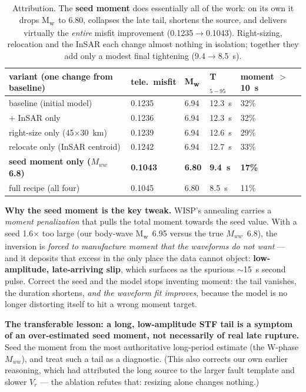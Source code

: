 \documentclass[11pt]{article}
\newcommand{\Mw}{M\textsubscript{w}}
\begin{document}
\begin{table}[H]\centering\small
\begin{tabular}{lllll}
\toprule
variant (one change from baseline) & tele.\ misfit & \Mw & T$_{5-95}$ & moment $>$10~s \\
\midrule
baseline (initial model) & 0.1235 & 6.94 & 12.3~s & 32\% \\
$+$ InSAR only & 0.1236 & 6.94 & 12.3~s & 32\% \\
right-size only (45$\times$30~km) & 0.1239 & 6.94 & 12.6~s & 29\% \\
relocate only (InSAR centroid) & 0.1242 & 6.94 & 12.7~s & 33\% \\
\textbf{seed moment only ($M_{ww}$ 6.8)} & \textbf{0.1043} & \textbf{6.80} & \textbf{9.4~s} & \textbf{17\%} \\
full recipe (all four) & 0.1045 & 6.80 & 8.5~s & 11\% \\
\bottomrule
\end{tabular}
\caption{Attribution. The \textbf{seed moment} does essentially all of the work: on its own it drops
\Mw\ to 6.80, collapses the late tail, shortens the source, and delivers virtually the \emph{entire}
misfit improvement (0.1235$\to$0.1043). Right-sizing, relocation and the InSAR each change almost
nothing in isolation; together they add only a modest final tightening (9.4$\to$8.5~s).}
\end{table}

\textbf{Why the seed moment is the key tweak.} WISP's annealing carries a \emph{moment
penalization} that pulls the total moment towards the seed value. With a seed 1.6$\times$ too large
(our body-wave \Mw~6.95 versus the true $M_{ww}$~6.8), the inversion is \emph{forced to manufacture
moment that the waveforms do not want} --- and it deposits that excess in the only place the data
cannot object: \textbf{low-amplitude, late-arriving slip}, which surfaces as the spurious
$\sim$15~s second pulse. Correct the seed and the model stops inventing moment: the tail vanishes,
the duration shortens, \emph{and the waveform fit improves}, because the model is no longer
distorting itself to hit a wrong moment target.

\textbf{The transferable lesson: a long, low-amplitude STF tail is a symptom of an over-estimated
seed moment, not necessarily of real late rupture.} Seed the moment from the most authoritative
long-period estimate (the W-phase $M_{ww}$), and treat such a tail as a diagnostic. (This also
corrects our own earlier reasoning, which had attributed the long source to the larger fault
template and slower $V_r$ --- the ablation refutes that: resizing alone changes nothing.)
\end{document}
